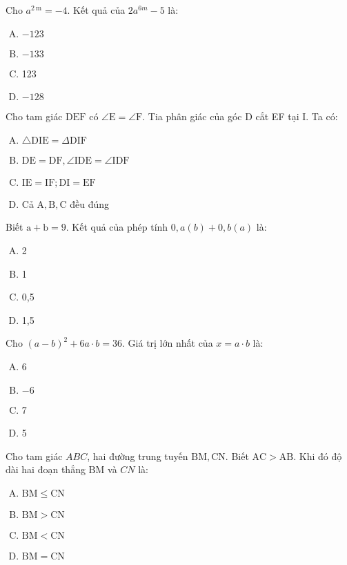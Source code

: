 \begin{bt}
	Cho $a^{2 \mathrm{~m}}=-4$. Kết quả của $2 a^{6 m}-5$ là:
	\begin{enumerate}[A.]
		\item $-123$
		\item $-133$
		\item 123
		\item $-128$
	\end{enumerate}
\end{bt}

\begin{bt}
	Cho tam giác $\mathrm{DEF}$ có $\angle \mathrm{E}=\angle \mathrm{F}$. Tia phân giác của góc $\mathrm{D}$ cắt EF tại $\mathrm{I}$. Ta có:
	\begin{enumerate}[A.]
		\item $\triangle \mathrm{DIE}=\Delta \mathrm{DIF}$
		\item $\mathrm{DE}=\mathrm{DF}, \angle \mathrm{IDE}=\angle \mathrm{IDF}$
		\item $\mathrm{IE}=\mathrm{IF} ; \mathrm{DI}=\mathrm{EF}$
		\item Cả $\mathrm{A}, \mathrm{B}, \mathrm{C}$ đều đúng
	\end{enumerate}
\end{bt}

\begin{bt}
	Biết $\mathrm{a}+\mathrm{b}=9$. Kết quả của phép tính $0, a(b)+0, b(a)$ là:
	\begin{enumerate}[A.]
		\item 2
		\item 1
		\item 0,5
		\item 1,5
	\end{enumerate}
\end{bt}

\begin{bt}
	Cho $(a-b)^2+6 a \cdot b=36$. Giá trị lớn nhất của $x=a \cdot b$ là:
	\begin{enumerate}[A.]
		\item 6
		\item $-6$
		\item 7
		\item 5
	\end{enumerate}
\end{bt}

\begin{bt}
	Cho tam giác $A B C$, hai đường trung tuyến $\mathrm{BM}, \mathrm{CN}$. Biết $\mathrm{AC}>\mathrm{AB}$. Khi đó độ dài hai đoạn thẳng $\mathrm{BM}$ và $C N$ là:
	\begin{enumerate}[A.]
		\item $\mathrm{BM} \leq \mathrm{CN}$
		\item $\mathrm{BM}>\mathrm{CN}$
		\item $\mathrm{BM}<\mathrm{CN}$
		\item $\mathrm{BM}=\mathrm{CN}$
	\end{enumerate}
\end{bt}

